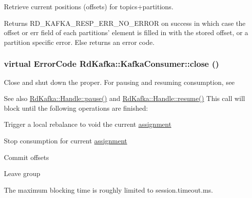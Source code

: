 Retrieve current positions (offsets) for topics+partitions. \begin{DoxyReturn}{Returns}
RD\_\-KAFKA\_\-RESP\_\-ERR\_\-NO\_\-ERROR on success in which case the {\ttfamily offset} or {\ttfamily err} field of each {\ttfamily partitions'} element is filled in with the stored offset, or a partition specific error. Else returns an error code. 
\end{DoxyReturn}
\hypertarget{classRdKafka_1_1KafkaConsumer_a5c78a721aa91f3be9903f09ddf084644}{
\subsubsection[{close}]{\setlength{\rightskip}{0pt plus 5cm}virtual ErrorCode RdKafka::KafkaConsumer::close ()}}
\label{classRdKafka_1_1KafkaConsumer_a5c78a721aa91f3be9903f09ddf084644}


Close and shut down the proper. For pausing and resuming consumption, see \begin{DoxySeeAlso}{See also}
\hyperlink{classRdKafka_1_1Handle_a6be6579b7e2a0427b4595fb559e58d0f}{RdKafka::Handle::pause()} and \hyperlink{classRdKafka_1_1Handle_a322d16d6786da2b4b20505f19325fcec}{RdKafka::Handle::resume()} This call will block until the following operations are finished:
\begin{DoxyItemize}
\item Trigger a local rebalance to void the current \hyperlink{classRdKafka_1_1KafkaConsumer_afd22626a2b370f378272e30411df6f78}{assignment}
\item Stop consumption for current \hyperlink{classRdKafka_1_1KafkaConsumer_afd22626a2b370f378272e30411df6f78}{assignment}
\item Commit offsets
\item Leave group
\end{DoxyItemize}
\end{DoxySeeAlso}
The maximum blocking time is roughly limited to session.timeout.ms.

